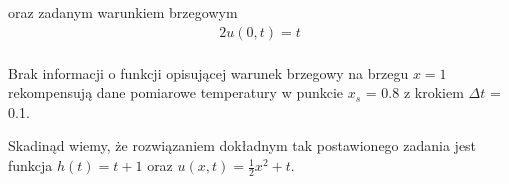 \documentclass[twoside]{projektInzynierskiMS1}
\newcounter{rowcnt}
\newcommand\rownum{\ifnumequal{\value{rowcnt}}{0}{\textbf{Nr.}}{\therowcnt.}\refstepcounter{rowcnt}}
\newcommand{\si}{ś}
\begin{document}
oraz zadanym warunkiem brzegowym
\begin{alignat*}{2}
u(0, t) = t\\
\end{alignat*}


Brak informacji o funkcji opisującej warunek brzegowy na brzegu $x = 1$ rekompensują dane pomiarowe temperatury w punkcie $x_s$ = 0.8 z krokiem $\Delta t$ = 0.1.

Skadinąd wiemy, że rozwiązaniem dokładnym tak postawionego zadania jest funkcja $h(t) = t+1$ oraz $u(x, t) = \frac{1}{2}x^2 +t$.






\end{document}
